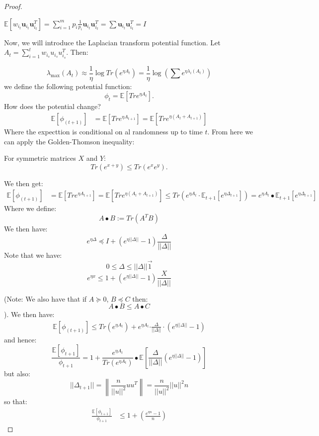\documentclass[11pt]{article}
\newcommand{\norm}[1]{\left\lVert#1\right\rVert}
\newcommand{\bu}{\mathbf{u}}
\begin{document}
\begin{proof}
\begin{claim}
$\mathbb{E}[w_{i_t}\bu_{i_t}\bu_{i_t}^T] = \sum_{i=1}^m p_i\frac{1}{p_{i}}\bu_{i_t}\bu_{i_t}^T = \sum \bu_{i_t}\bu_{i_t}^T = I$
\end{claim}

\vspace{5mm}
Now, we will introduce the Laplacian transform potential function.
Let $A_t = \sum_{i=1}^t w_{i_s} u_{i_s}u_{i_s}^T$. Then:

\[
\lambda_{\max}(A_t) \approx \frac{1}{\eta} \log Tr(e^{\eta A_t}) = \frac{1}{\eta} \log (\sum e^{\eta \lambda_i(A_t)})
\]
we define the following potential function:
\[
    \phi_t = \mathbb{E}[Tr e^{\eta A_t}].
\]
How does the potential change?
\begin{align*}
    \mathbb{E}[\phi_{(t+1)}]&= \mathbb{E}[Tr e^{\eta A_{t+1}}] = \mathbb{E}[Tr e^{\eta(A_t + A_{t+1})}]
\end{align*}
Where the expecttion is conditional on al randomness up to time $t$. From here we can apply the Golden-Thomson inequality:
\begin{theorem}
For symmetric matrices $X$ and $Y$:
\[
    Tr(e^{x+y}) \leq Tr(e^xe^y).
\]
\end{theorem}
We then get:
\begin{align*}
    \mathbb{E}[\phi_{(t+1)}]&= \mathbb{E}[Tr e^{\eta A_{t+1}}] = \mathbb{E}[Tr e^{\eta(A_t + A_{t+1})}] \leq Tr(e^{\eta A_t}\cdot\mathbb{E}_{t+1}[e^{\eta \Delta_{t+1}}]) = e^{\eta A_t}\bullet\mathbb{E}_{t+1}[e^{\eta \Delta_{t+1}}] 
\end{align*}
Where we define:
\[
    A \bullet B:= Tr(A^TB)    
\]
We then have:
\[
    e^{\eta \Delta} \preceq I + (e^{\eta ||\Delta||} -1)\frac{\Delta}{||\Delta||}
\]
Note that we have:
\[
    0 \leq\Delta \leq ||\Delta||\vec{1}
\]
\[
    e^{\eta x} \leq 1 + (e^{\eta ||\Delta||} -1)\frac{X}{||\Delta||}
\]

(Note: We also have that if $A \succeq 0$, $B \preceq C$ then:
\[
    A \bullet B \leq A \bullet C
\]
). We then have:
\begin{align*}
    \mathbb{E}[\phi_{(t+1)}]\leq Tr(e^{\eta A_t}) + e^{\eta A_t} \boldsymbol{\cdot} \frac{\Delta}{||\Delta||} \cdot(e^{\eta ||\Delta||} - 1)
\end{align*}
and hence:
\[
    \frac{\mathbb{E}[\phi_{t+1}]}{\phi_{t+1}} = 1+\frac{e^{\eta A_t}}{Tr(e^{\eta A_t})}\bullet\mathbb{E}\left[ \frac{\Delta}{||\Delta||}(e^{\eta||\Delta||} -1)\right] 
\]
but also:
\[
    ||\Delta_{t+1}||=\norm{\frac{n}{||u||^2}u u^T} = \frac{n}{||u||^2}||u||^2 n
\]
so that:
\begin{align*}
    \frac{\mathbb{E}[\phi_{t+1}]}{\phi_{t+1}}&\leq 1 +\left(\frac{e^{\eta n }-1}{n}\right)
\end{align*}


\end{proof}
\end{document}
